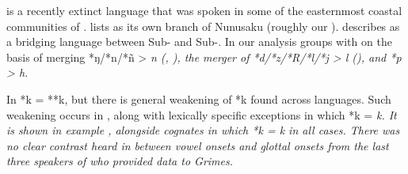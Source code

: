  is a recently extinct language \citep{Grimes2010b} that
was spoken in some of the easternmost coastal communities of .
\citet[20]{Collins1983} lists  as its own branch of Nunusaku (roughly our ).
\citet[8]{Stresemann1927} describes  as a bridging language
between Sub- and Sub-.
In our analysis   groups with  on the
basis of merging *ŋ/*n/*ñ > \it{n} (,
), the merger of *d/*z/*R/*l/*j > \it{l} (),
and *p > \it{h}.

In  *k = **k,
but there is general weakening of *k found across  languages.
Such weakening occurs in ,
along with lexically specific exceptions in which *k = \it{k}.
It is shown in example ,
alongside  cognates in which *k = \it{k} in all cases.
There was no clear contrast heard in  between vowel onsets
and glottal onsets from the last three speakers of  who
provided data to Grimes.

